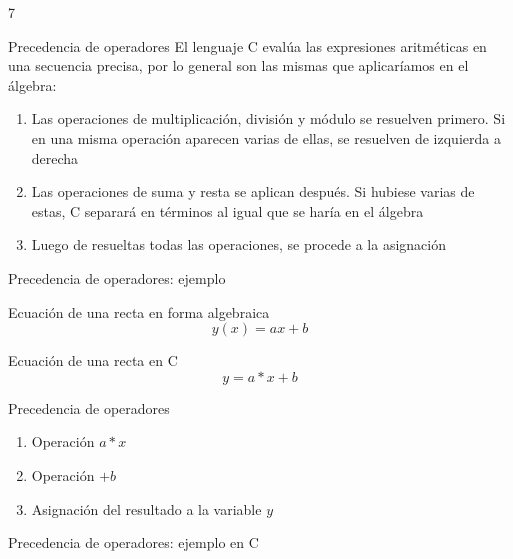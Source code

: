 7\documentclass[xcolor=pdftex,table,11pt]{beamer}
\begin{document}
\begin{frame}{Precedencia de operadores}
El lenguaje C evalúa las expresiones aritméticas en una secuencia precisa, por lo general son las mismas que aplicaríamos en el álgebra:\\

\begin{enumerate}
\item<1->  Las operaciones de multiplicación, división y módulo se resuelven primero. Si en una misma operación aparecen varias de ellas, se resuelven de izquierda a derecha

\item<2->  Las operaciones de suma y resta se aplican después. Si hubiese varias de estas, C separará en términos al igual que se haría en el álgebra

\item<3-> Luego de resueltas todas las operaciones, se procede a la asignación

\end{enumerate}
\end{frame}

\begin{frame}{Precedencia de operadores: ejemplo}


 \begin{block}{Ecuación de una recta en forma algebraica}
\begin{equation}
y(x) = a x + b
\end{equation}
    \end{block}
    

 \begin{block}{Ecuación de una recta en C}
\begin{equation}
y = a * x + b
\end{equation}


  \end{block}

 \begin{block}{Precedencia de operadores}
 \begin{enumerate}
\item<1->  Operación $a * x$
\item<2->  Operación $+b$
\item<3->  Asignación del resultado a la variable $y$
\end{enumerate}
  \end{block}
\end{frame}
\begin{frame}{Precedencia de operadores: ejemplo en C}
\codesetstylefrombeamer
{}
\end{frame}
\end{document}
